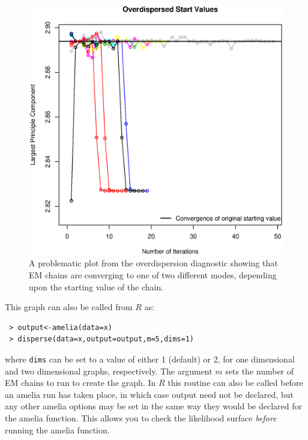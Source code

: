 \documentclass[12pt,titlepage]{article}
\begin{document}
\begin{figure}
  \centering
  \includegraphics[scale=.5]{disperse-bad.eps}
  \caption{ A problematic plot from the overdispersion diagnostic showing that EM chains are converging to one of two different modes, depending upon the starting value of the chain.}
\end{figure}


This graph can also be called from $R$ as:
\begin{verbatim}
 > output<-amelia(data=x) 
 > disperse(data=x,output=output,m=5,dims=1)
\end{verbatim}
where \texttt{dims} can be set to a value of either 1 (default) or 2, for one dimensional and two dimensional graphs, respectively.  The argument $m$ sets the number of EM chains to run to create the graph.  In $R$ this routine can also be called before an amelia run has taken place, in which case output need not be declared, but any other amelia options may be set in the same way they would be declared for the amelia function.  This allows you to check the likelihood surface \emph{before} running the amelia function.
\end{document}
